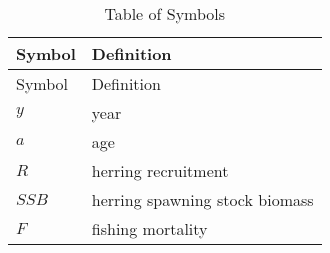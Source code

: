 \documentclass[]{article}
\begin{document}
\begin{longtable}[]{@{}ll@{}}
\caption{Table of Symbols \label{symtab}}\tabularnewline
\toprule
\begin{minipage}[b]{0.13\columnwidth}\raggedright\strut
Symbol\strut
\end{minipage} & \begin{minipage}[b]{0.76\columnwidth}\raggedright\strut
Definition\strut
\end{minipage}\tabularnewline
\midrule
\endfirsthead
\toprule
\begin{minipage}[b]{0.13\columnwidth}\raggedright\strut
Symbol\strut
\end{minipage} & \begin{minipage}[b]{0.76\columnwidth}\raggedright\strut
Definition\strut
\end{minipage}\tabularnewline
\midrule
\endhead
\begin{minipage}[t]{0.13\columnwidth}\raggedright\strut
\(y\)\strut
\end{minipage} & \begin{minipage}[t]{0.76\columnwidth}\raggedright\strut
year\strut
\end{minipage}\tabularnewline
\begin{minipage}[t]{0.13\columnwidth}\raggedright\strut
\(a\)\strut
\end{minipage} & \begin{minipage}[t]{0.76\columnwidth}\raggedright\strut
age\strut
\end{minipage}\tabularnewline
\begin{minipage}[t]{0.13\columnwidth}\raggedright\strut
\(R\)\strut
\end{minipage} & \begin{minipage}[t]{0.76\columnwidth}\raggedright\strut
herring recruitment\strut
\end{minipage}\tabularnewline
\begin{minipage}[t]{0.13\columnwidth}\raggedright\strut
\(SSB\)\strut
\end{minipage} & \begin{minipage}[t]{0.76\columnwidth}\raggedright\strut
herring spawning stock biomass\strut
\end{minipage}\tabularnewline
\begin{minipage}[t]{0.13\columnwidth}\raggedright\strut
\(F\)\strut
\end{minipage} & \begin{minipage}[t]{0.76\columnwidth}\raggedright\strut
fishing mortality\strut
\end{minipage}\tabularnewline

\end{longtable}
\end{document}
